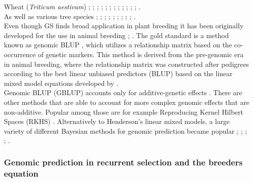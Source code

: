 Wheat (\textit{Triticum aestivum}) \cite{Thavamanikumar_2015}; \cite{Lopez_Cruz_2015};
\cite{Sukumaran_2016}; \cite{Bustos_Korts_2016}; \cite{Gianola_2016_wheat};
\cite{Crossa_2016_wheat}; \cite{Rincent_2018}; \cite{Norman_2018}; \cite{Belamkar_2018};
\cite{Ovenden_2018}; \cite{Cuevas_2019}; \cite{Howard_2019}; \cite{Krause_2019}. \\
As well as various tree species \cite{Holliday_2012}; \cite{Resende_2012}; \cite{Zapata_Valenzuela_2013};  \cite{Jaramillo_Correa_2014}; \cite{Kumar_2015}; \cite{GamalElDien_2016}; \cite{Ratcliffe_2017}; \cite{Rincent_2018}; \cite{Kainer_2018}; \cite{deAlmeidaFilho2019}. \\
Even though GS finds broad application in plant breeding it has been originally developed
for the use in animal breeding \cite{hayes2010genome}; \cite{goddard2011using}. The gold
standard is a method known as genomic BLUP \cite{vanraden2008efficient}, which utilizes a
relationship matrix based on the co-occurrence of genetic markers. This method is derived
from the pre-genomic era in animal breeding, where the relationship matrix was constructed
after pedigrees according to the best linear unbiased predictors (BLUP) based on the
linear mixed
model equations developed by \cite{henderson1975best}. \\
Genomic BLUP (GBLUP) accounts only for additive-genetic effects
\cite{vanraden2008efficient}. There are other methods that are able to account for more
complex genomic effects that are non-additive. Popular among those are for example
Reproducing Kernel Hilbert Spaces (RKHS) \cite{gianola2008reproducing}. Alternatively to
Henderson's linear mixed models, a large variety of different Bayesian methods for genomic
prediction became popular \cite{hayes2001}; \cite{gianola2009}; \cite{habier2011};
\cite{gianola2013}; \cite{crossa2017}.

\subsubsection{Genomic prediction in recurrent selection and the breeders equation}

